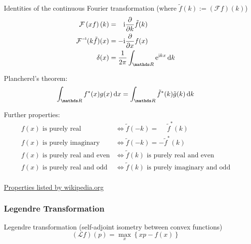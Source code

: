 			\noindent
			Identities of the continuous Fourier transformation (where $\tilde{f}(k) := \left(\mathcal{F}f\right)(k)$)
			\begin{equation}
				\begin{aligned}
					\mathcal{F}\left(xf\right)(k) &= \phantom{-}\i \pdv{k}\tilde{f}(k) \\
					\inv{\mathcal{F}}(k\tilde{f})(x) &= -\i\pdv{x}f(x) \\
					\delta(x) &= \frac{1}{2\pi}\int_{\reals}\ex^{\i kx}\dd{k}
					\label{Eq:FourierIdentities}
				\end{aligned}
			\end{equation}

			\noindent
			Plancherel's theorem:
			\begin{equation}
				\int_{\reals } f^{*}(x) g(x)\dd{x} =
				\int_{\reals }\tilde{f}^{*}(k)\tilde{g}(k)\dd{k}
			\end{equation}

			\noindent
			Further properties:
			\begin{equation}
				\begin{aligned}
					f(x)\text{ is purely real} &\iff \tilde{f}(-k) = \phantom{-}\tilde{f}^*(k) \\
					f(x)\text{ is purely imaginary} &\iff \tilde{f}(-k) = -\tilde{f}^*(k) \\
					f(x)\text{ is purely real and even} &\iff \tilde{f}(k)\text{ is purely real and even} \\
					f(x)\text{ is purely real and odd} &\iff \tilde{f}(k)\text{ is purely imaginary and odd} \\
				\end{aligned}
			\end{equation}

			\noindent
			\href{https://en.wikipedia.org/wiki/Fourier_transform#Functional_relationships,_one-dimensional}{Properties listed by wikipedia.org}

		\subsubsection{Legendre Transformation}
			\noindent
			Legendre transformation (self-adjoint isometry between convex functions)
			\begin{equation}
				(\mathcal{L}f)(p)=\max_x\left\lbrace xp-f(x) \right\rbrace
			\end{equation}


